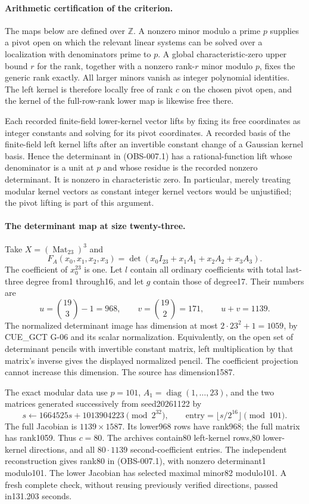 \paragraph{Arithmetic certification of the criterion.}
The maps below are defined over $\mathbb Z$. A nonzero minor modulo
a prime $p$ supplies a pivot open on which the relevant linear
systems can be solved over a localization with denominators prime
to $p$. A global characteristic-zero upper bound $r$ for the rank,
together with a nonzero rank-$r$ minor modulo $p$, fixes the generic
rank exactly. All larger minors vanish as integer polynomial
identities. The left kernel is therefore locally free of rank $c$
on the chosen pivot open, and the kernel of the full-row-rank lower
map is likewise free there.

Each recorded finite-field lower-kernel vector lifts by fixing its
free coordinates as integer constants and solving for its pivot
coordinates. A recorded basis of the finite-field left kernel
lifts after an invertible constant change of a Gaussian kernel
basis. Hence the determinant in (OBS-007.1) has a rational-function
lift whose denominator is a unit at $p$ and whose residue is the
recorded nonzero determinant. It is nonzero in characteristic zero.
In particular, merely treating modular kernel vectors as constant
integer kernel vectors would be unjustified; the pivot lifting is
part of this argument.

\paragraph{The determinant map at size twenty-three.}
Take $X=(\operatorname{Mat}_{23})^3$ and
\[
 F_A(x_0,x_1,x_2,x_3)
       =\det(x_0I_{23}+x_1A_1+x_2A_2+x_3A_3).
\]
The coefficient of $x_0^{23}$ is one. Let $l$ contain all ordinary
coefficients with total last-three degree from1 through16, and
let $g$ contain those of degree17. Their numbers are
\[
 u=\binom{19}{3}-1=968,\qquad
 v=\binom{19}{2}=171,\qquad u+v=1139.
\]
The normalized determinant image has dimension at most
$2\cdot23^2+1=1059$, by CUE\_GCT G-06 and its scalar normalization.
Equivalently, on the open set of determinant pencils with invertible
constant matrix, left multiplication by that matrix's inverse gives
the displayed normalized pencil. The coefficient projection cannot
increase this dimension. The source has dimension1587.

The exact modular data use $p=101$, $A_1=\operatorname{diag}(1,\ldots,23)$,
and the two matrices generated successively from seed20261122 by
\[
 s\leftarrow1664525s+1013904223\pmod{2^{32}},
 \qquad \text{entry}=\lfloor s/2^{16}\rfloor\pmod{101}.
\]
The full Jacobian is $1139\times1587$. Its lower968 rows have
rank968; the full matrix has rank1059. Thus $c=80$.
The archives contain80 left-kernel rows,80 lower-kernel directions,
and all $80\cdot1139$ second-coefficient entries. The independent
reconstruction gives rank80 in (OBS-007.1), with nonzero determinant1
modulo101. The lower Jacobian has selected maximal minor82 modulo101.
A fresh complete check, without reusing previously verified directions,
passed in131.203 seconds.

